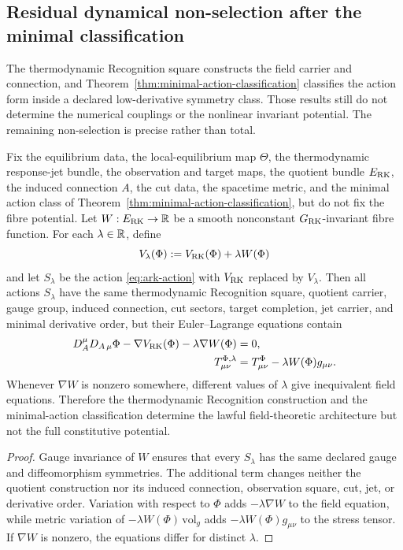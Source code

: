 \subsection{Residual dynamical non-selection after the minimal classification}
\label{sec:dynamical-nonselection}

The thermodynamic Recognition square constructs the field carrier and connection, and Theorem~\ref{thm:minimal-action-classification} classifies the action form inside a declared low-derivative symmetry class.  Those results still do not determine the numerical couplings or the nonlinear invariant potential.  The remaining non-selection is precise rather than total.

\begin{theorem}
\label{thm:dynamical-nonselection}
Fix the equilibrium data, the local-equilibrium map $\Theta$, the thermodynamic response-jet bundle, the observation and target maps, the quotient bundle $E_{\mathrm{RK}}$, the induced connection $A$, the cut data, the spacetime metric, and the minimal action class of Theorem~\ref{thm:minimal-action-classification}, but do not fix the fibre potential.  Let $W:E_{\mathrm{RK}}\to\mathbb R$ be a smooth nonconstant $G_{\mathrm{RK}}$-invariant fibre function.  For each $\lambda\in\mathbb R$, define
\[
V_\lambda(\Phi):=V_{\mathrm{RK}}(\Phi)+\lambda W(\Phi)
\]
and let $S_\lambda$ be the action \eqref{eq:ark-action} with $V_{\mathrm{RK}}$ replaced by $V_\lambda$.  Then all actions $S_\lambda$ have the same thermodynamic Recognition square, quotient carrier, gauge group, induced connection, cut sectors, target completion, jet carrier, and minimal derivative order, but their Euler--Lagrange equations contain
\begin{align}
D_A^\mu D_{A\,\mu}\Phi
-\nabla V_{\mathrm{RK}}(\Phi)
-\lambda\nabla W(\Phi)&=0,
\label{eq:nonselection-field}\\
T^{\Phi,\lambda}_{\mu\nu}
&=T^\Phi_{\mu\nu}-\lambda W(\Phi)g_{\mu\nu}.
\label{eq:nonselection-stress}
\end{align}
Whenever $\nabla W$ is nonzero somewhere, different values of $\lambda$ give inequivalent field equations.  Therefore the thermodynamic Recognition construction and the minimal-action classification determine the lawful field-theoretic architecture but not the full constitutive potential.
\end{theorem}

\begin{proof}
Gauge invariance of $W$ ensures that every $S_\lambda$ has the same declared gauge and diffeomorphism symmetries.  The additional term changes neither the quotient construction nor its induced connection, observation square, cut, jet, or derivative order.  Variation with respect to $\Phi$ adds $-\lambda\nabla W$ to the field equation, while metric variation of $-\lambda W(\Phi)\,\mathrm{vol}_g$ adds $-\lambda W(\Phi)g_{\mu\nu}$ to the stress tensor.  If $\nabla W$ is nonzero, the equations differ for distinct $\lambda$.
\end{proof}

